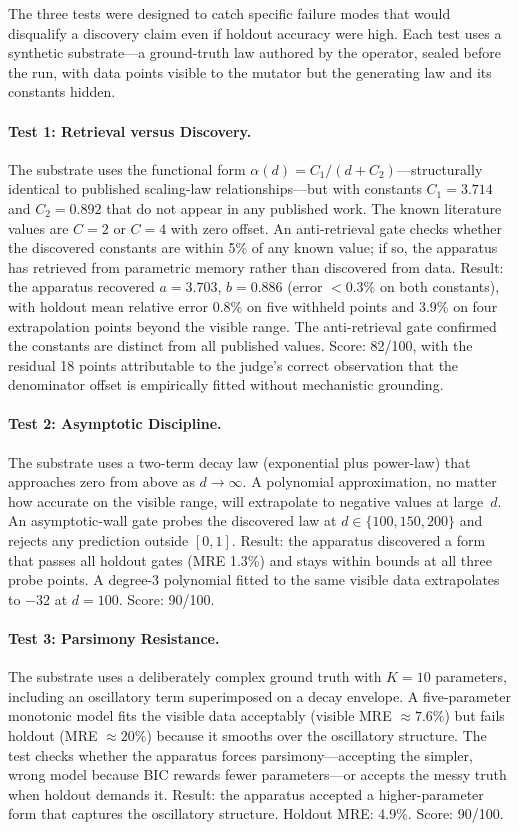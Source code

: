 \documentclass[11pt]{article}
\begin{document}
The three tests were designed to catch specific failure modes that would disqualify a discovery claim even if holdout accuracy were high. Each test uses a synthetic substrate---a ground-truth law authored by the operator, sealed before the run, with data points visible to the mutator but the generating law and its constants hidden.

\paragraph{Test 1: Retrieval versus Discovery.} The substrate uses the functional form $\alpha(d) = C_1 / (d + C_2)$---structurally identical to published scaling-law relationships---but with constants $C_1 = 3.714$ and $C_2 = 0.892$ that do not appear in any published work. The known literature values are $C = 2$ or $C = 4$ with zero offset. An anti-retrieval gate checks whether the discovered constants are within 5\% of any known value; if so, the apparatus has retrieved from parametric memory rather than discovered from data. Result: the apparatus recovered $a = 3.703$, $b = 0.886$ (error ${<}0.3\%$ on both constants), with holdout mean relative error 0.8\% on five withheld points and 3.9\% on four extrapolation points beyond the visible range. The anti-retrieval gate confirmed the constants are distinct from all published values. Score: 82/100, with the residual 18 points attributable to the judge's correct observation that the denominator offset is empirically fitted without mechanistic grounding.

\paragraph{Test 2: Asymptotic Discipline.} The substrate uses a two-term decay law (exponential plus power-law) that approaches zero from above as $d \to \infty$. A polynomial approximation, no matter how accurate on the visible range, will extrapolate to negative values at large~$d$. An asymptotic-wall gate probes the discovered law at $d \in \{100, 150, 200\}$ and rejects any prediction outside $[0, 1]$. Result: the apparatus discovered a form that passes all holdout gates (MRE 1.3\%) and stays within bounds at all three probe points. A degree-3 polynomial fitted to the same visible data extrapolates to $-32$ at $d = 100$. Score: 90/100.

\paragraph{Test 3: Parsimony Resistance.} The substrate uses a deliberately complex ground truth with $K = 10$ parameters, including an oscillatory term superimposed on a decay envelope. A five-parameter monotonic model fits the visible data acceptably (visible MRE ${\approx}7.6\%$) but fails holdout (MRE ${\approx}20\%$) because it smooths over the oscillatory structure. The test checks whether the apparatus forces parsimony---accepting the simpler, wrong model because BIC rewards fewer parameters---or accepts the messy truth when holdout demands it. Result: the apparatus accepted a higher-parameter form that captures the oscillatory structure. Holdout MRE: 4.9\%. Score: 90/100.
\end{document}
